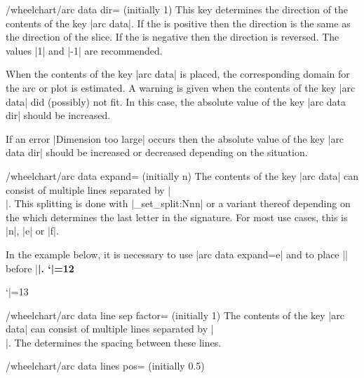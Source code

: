 \documentclass[a4paper,english,dvipsnames]{ltxdoc}
\begin{document}
\begin{key}{/wheelchart/arc data dir= (initially 1)}
This key determines the direction of the contents of the key |arc data|. If the  is positive then the direction is the same as the direction of the slice. If the  is negative then the direction is reversed. The values |1| and |-1| are recommended.

When the contents of the key |arc data| is placed, the corresponding domain for the arc or plot is estimated. A warning is given when the contents of the key |arc data| did (possibly) not fit. In this case, the absolute value of the key |arc data dir| should be increased.

If an error |Dimension too large| occurs then the absolute value of the key |arc data dir| should be increased or decreased depending on the situation.
\end{key}
\begin{key}{/wheelchart/arc data expand= (initially n)}
The contents of the key |arc data| can consist of multiple lines separated by |\\|. This splitting is done with |\seq_set_split:Nnn| or a variant thereof depending on the  which determines the last letter in the signature. For most use cases, this  is |n|, |e| or |f|.

In the example below, it is necessary to use |arc data expand=e| and to place |\noexpand| before |\bfseries|.
\catcode`|=12%
\begin{codeexample}[width=10cm,preamble={\usetikzlibrary{decorations.text}}]
\end{codeexample}
\catcode`|=13%
\end{key}
\begin{key}{/wheelchart/arc data line sep factor= (initially 1)}
The contents of the key |arc data| can consist of multiple lines separated by |\\|. The  determines the spacing between these lines.
\end{key}
\begin{key}{/wheelchart/arc data lines pos= (initially 0.5)}
\end{key}
\end{document}
